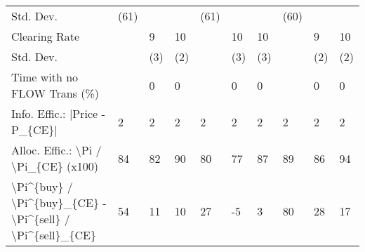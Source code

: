 \begin{tabular}{llllllllll}
 Std. Dev.                                                 & (61)     &          &          & (61)     &          &          & (60)      &           &           \\
 Clearing Rate                                             &          & 9        & 10       &          & 10       & 10       &           & 9         & 10        \\
 Std. Dev.                                                 &          & (3)      & (2)      &          & (3)      & (3)      &           & (2)       & (2)       \\
 Time with no FLOW Trans (\%)                               &          & 0        & 0        &          & 0        & 0        &           & 0         & 0         \\
 Info. Effic.: |Price - P\_\{CE\}|                            & 2        & 2        & 2        & 2        & 2        & 2        & 2         & 2         & 2         \\
 Alloc. Effic.: \textbackslash{}Pi / \textbackslash{}Pi\_\{CE\} (x100)                      & 84       & 82       & 90       & 80       & 77       & 87       & 89        & 86        & 94        \\
 \textbackslash{}Pi\^{}\{buy\} / \textbackslash{}Pi\^{}\{buy\}\_\{CE\} - \textbackslash{}Pi\^{}\{sell\} / \textbackslash{}Pi\^{}\{sell\}\_\{CE\} & 54       & 11       & 10       & 27       & -5       & 3        & 80        & 28        & 17        \\
\hline
\end{tabular}
